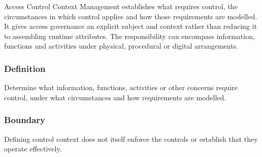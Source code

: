 Access Control Context Management establishes what requires control, the circumstances in which control applies and how those requirements are modelled. It gives access governance an explicit subject and context rather than reducing it to assembling runtime attributes. The responsibility can encompass information, functions and activities under physical, procedural or digital arrangements.

\subsubsection*{Definition}

Determine what information, functions, activities or other concerns require control, under what circumstances and how requirements are modelled.

\subsubsection*{Boundary}

Defining control context does not itself enforce the controls or establish that they operate effectively.

